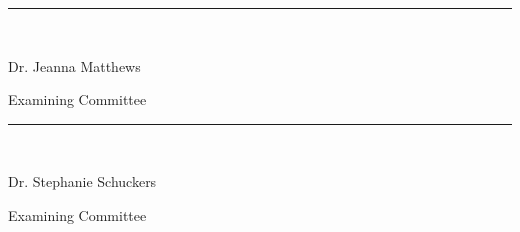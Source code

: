 \documentclass[a4paper, 11pt, oneside]{ThesisProposal}
\begin{document}
\vspace{2\baselineskip}
\parbox{1.5in}{}           \hfill  \rule{3.5in}{0.7pt}\\
\parbox{1.5in}{}           \hfill  Dr. Jeanna Matthews\\
\parbox{1.5in}{}           \hfill  Examining Committee\\

\vspace{2\baselineskip}
\parbox{1.5in}{}           \hfill  \rule{3.5in}{0.7pt}\\
\parbox{1.5in}{}           \hfill  Dr. Stephanie Schuckers\\
\parbox{1.5in}{}           \hfill  Examining Committee\\

\clearpage


\pagestyle{fancy}
\end{document}
